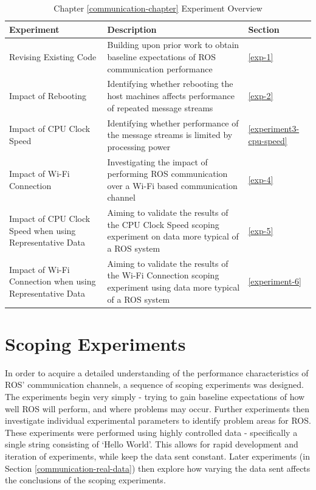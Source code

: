 \documentclass{l4proj}
\begin{document}
\begin{table}[H]
\centering
\caption{Chapter \ref{communication-chapter} Experiment Overview}
\label{communication-experiment-overview}
\begin{tabular}{|p{}|p{}|p{}|}
\hline
\textbf{Experiment}         & \textbf{Description}                                                                              & \textbf{Section}              \\ \hline
Revising Existing Code      & Building upon prior work to obtain baseline expectations of ROS communication performance         & \ref{exp-1}                 \\ \hline
Impact of Rebooting        & Identifying whether rebooting the host machines affects performance of repeated message streams   & \ref{exp-2}                 \\ \hline
Impact of CPU Clock Speed  & Identifying whether performance of the message streams is limited by processing power             & \ref{experiment3-cpu-speed} \\ \hline
Impact of Wi-Fi Connection & Investigating the impact of performing ROS communication over a Wi-Fi based communication channel & \ref{exp-4}                 \\ \hline
Impact of CPU Clock Speed when using Representative Data & Aiming to validate the results of the CPU Clock Speed scoping experiment on data more typical of a ROS system  & \ref{exp-5} \\ \hline
Impact of Wi-Fi Connection when using Representative Data & Aiming to validate the results of the Wi-Fi Connection scoping experiment using data more typical of a ROS system & \ref{experiment-6} \\ \hline

\end{tabular}
\end{table}

\section{Scoping Experiments}
\label{communication-scoping-experiments}

In order to acquire a detailed understanding of the performance characteristics of ROS' communication channels, a sequence of scoping experiments was designed. The experiments begin very simply - trying to gain baseline expectations of how well ROS will perform, and where problems may occur. Further experiments then investigate individual experimental parameters to identify problem areas for ROS. These experiments were performed using highly controlled data - specifically a single string consisting of `Hello World'. This allows for rapid development and iteration of experiments, while keep the data sent constant. Later experiments (in Section \ref{communication-real-data}) then explore how varying the data sent affects the conclusions of the scoping experiments.
\end{document}
